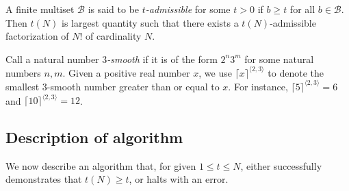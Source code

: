 \documentclass[12pt,a4paper,reqno]{amsart}
\numberwithin{equation}{section}
\theoremstyle{plain}
\theoremstyle{definition}
\newcommand\tuple{{\mathcal B}}
\begin{document}
A finite multiset $\tuple$ is said to be \emph{$t$-admissible} for some $t>0$ if $b \geq t$ for all $b \in \tuple$.  Then $t(N)$ is largest quantity such that there exists a $t(N)$-admissible factorization of $N!$ of cardinality $N$.  

Call a natural number \emph{$3$-smooth} if it is of the form $2^n 3^m$ for some natural numbers $n,m$.  Given a positive real number $x$, we use $\lceil x \rceil^{\langle 2,3 \rangle}$ to denote the smallest $3$-smooth number greater than or equal to $x$.  For instance, $\lceil 5 \rceil^{\langle 2,3 \rangle} = 6$ and $\lceil 10 \rceil^{\langle 2,3 \rangle} = 12$.

\subsection{Description of algorithm}\label{alg-desc}

We now describe an algorithm that, for given $1 \leq t \leq N$, either successfully demonstrates that $t(N) \geq t$, or halts with an error.
\end{document}
